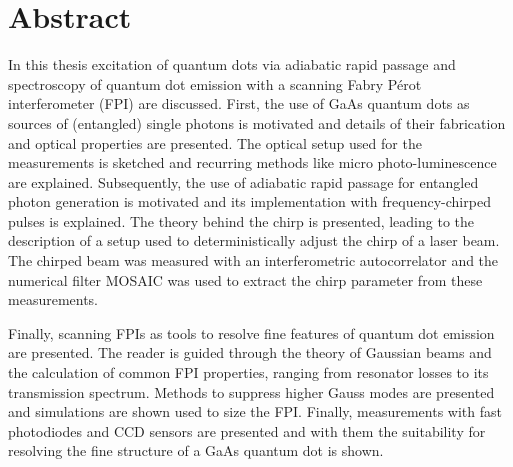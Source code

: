 

\chapter*{Abstract}
\label{cha:abstract}


In this thesis excitation of quantum dots via adiabatic rapid passage and spectroscopy of quantum dot emission with a scanning Fabry Pérot interferometer (FPI) are discussed.
First, the use of GaAs quantum dots as sources of (entangled) single photons is motivated and details of their fabrication and optical properties are presented.
The optical setup used for the measurements is sketched and recurring methods like micro photo-luminescence are explained.
Subsequently, the use of adiabatic rapid passage for entangled photon generation is motivated and its implementation with frequency-chirped pulses is explained.
The theory behind the chirp is presented, leading to the description of a setup used to deterministically adjust the chirp of a laser beam.
The chirped beam was measured with an interferometric autocorrelator and the numerical filter MOSAIC was used to extract the chirp parameter from these measurements.

Finally, scanning FPIs as tools to resolve fine features of quantum dot emission are presented.
The reader is guided through the theory of Gaussian beams and the calculation of common FPI properties, ranging from resonator losses to its transmission spectrum.
Methods to suppress higher Gauss modes are presented and simulations are shown used to size the FPI.
Finally, measurements with fast photodiodes and CCD sensors are presented and with them the suitability for resolving the fine structure of a GaAs quantum dot is shown.   

